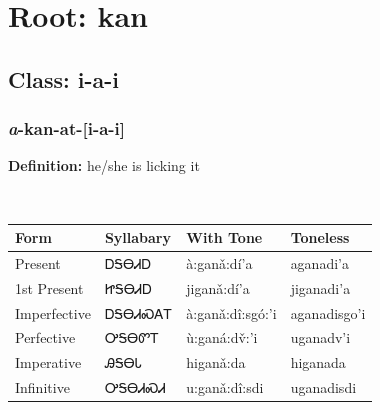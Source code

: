 \needspace{4in}
\section*{Root: kan}
\nopagebreak
{}
\needspace{3in}
\subsection*{Class: i-a-i}
\nopagebreak
\needspace{2in}
\subsubsection*{\textit{a}{-}\textbf{kan}{-}at{-}[i-a-i]}
\nopagebreak
\textbf{Definition: } he/she is licking it
\\[0.5em]
\begin{tabularx}{\textwidth}{l X X X}%
\toprule%
\textbf{Form}&\textbf{Syllabary}&\textbf{With Tone}&\textbf{Toneless}\\%
\midrule%
Present&ᎠᎦᎾᏗᎠ&à:ganǎ:dí’a&aganadi’a\\%
1st Present&ᏥᎦᎾᏗᎠ&jiganǎ:dí’a&jiganadi’a\\%
Imperfective&ᎠᎦᎾᏗᏍᎪᎢ&à:ganǎ:dî:sgó:’i&aganadisgo’i\\%
Perfective&ᎤᎦᎾᏛᎢ&ù:ganá:dv̌:’i&uganadv’i\\%
Imperative&ᎯᎦᎾᏓ&higanǎ:da&higanada\\%
Infinitive&ᎤᎦᎾᏗᏍᏗ&u:ganǎ:dî:sdi&uganadisdi\\%
\bottomrule%
\end{tabularx}
\\[1em]